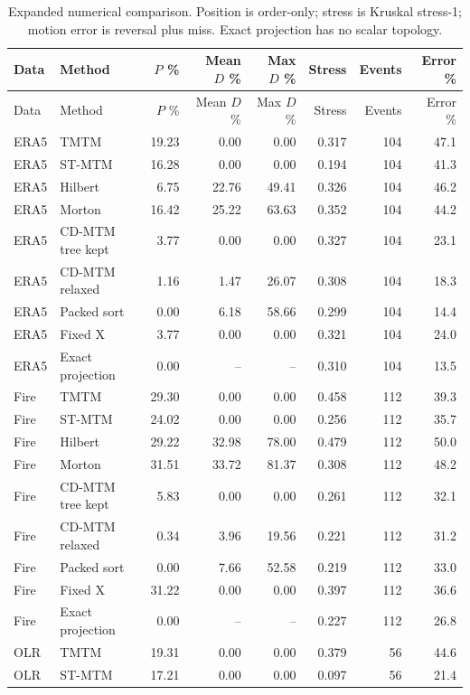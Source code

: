 \begingroup\small\setlength{\tabcolsep}{4pt}
\begin{longtable}{llrrrrrr}
\caption{Expanded numerical comparison. Position is order-only; stress is Kruskal stress-1; motion error is reversal plus miss. Exact projection has no scalar topology.}\\\toprule
Data & Method & $P$ \% & Mean $D$ \% & Max $D$ \% & Stress & Events & Error \%\\\midrule\endfirsthead
\toprule Data & Method & $P$ \% & Mean $D$ \% & Max $D$ \% & Stress & Events & Error \%\\\midrule\endhead
\bottomrule\endfoot
ERA5 & TMTM & 19.23 & 0.00 & 0.00 & 0.317 & 104 & 47.1\\
ERA5 & ST-MTM & 16.28 & 0.00 & 0.00 & 0.194 & 104 & 41.3\\
ERA5 & Hilbert & 6.75 & 22.76 & 49.41 & 0.326 & 104 & 46.2\\
ERA5 & Morton & 16.42 & 25.22 & 63.63 & 0.352 & 104 & 44.2\\
ERA5 & CD-MTM tree kept & 3.77 & 0.00 & 0.00 & 0.327 & 104 & 23.1\\
ERA5 & CD-MTM relaxed & 1.16 & 1.47 & 26.07 & 0.308 & 104 & 18.3\\
ERA5 & Packed sort & 0.00 & 6.18 & 58.66 & 0.299 & 104 & 14.4\\
ERA5 & Fixed X & 3.77 & 0.00 & 0.00 & 0.321 & 104 & 24.0\\
ERA5 & Exact projection & 0.00 & -- & -- & 0.310 & 104 & 13.5\\
Fire & TMTM & 29.30 & 0.00 & 0.00 & 0.458 & 112 & 39.3\\
Fire & ST-MTM & 24.02 & 0.00 & 0.00 & 0.256 & 112 & 35.7\\
Fire & Hilbert & 29.22 & 32.98 & 78.00 & 0.479 & 112 & 50.0\\
Fire & Morton & 31.51 & 33.72 & 81.37 & 0.308 & 112 & 48.2\\
Fire & CD-MTM tree kept & 5.83 & 0.00 & 0.00 & 0.261 & 112 & 32.1\\
Fire & CD-MTM relaxed & 0.34 & 3.96 & 19.56 & 0.221 & 112 & 31.2\\
Fire & Packed sort & 0.00 & 7.66 & 52.58 & 0.219 & 112 & 33.0\\
Fire & Fixed X & 31.22 & 0.00 & 0.00 & 0.397 & 112 & 36.6\\
Fire & Exact projection & 0.00 & -- & -- & 0.227 & 112 & 26.8\\
OLR & TMTM & 19.31 & 0.00 & 0.00 & 0.379 & 56 & 44.6\\
OLR & ST-MTM & 17.21 & 0.00 & 0.00 & 0.097 & 56 & 21.4\\

\end{longtable}
